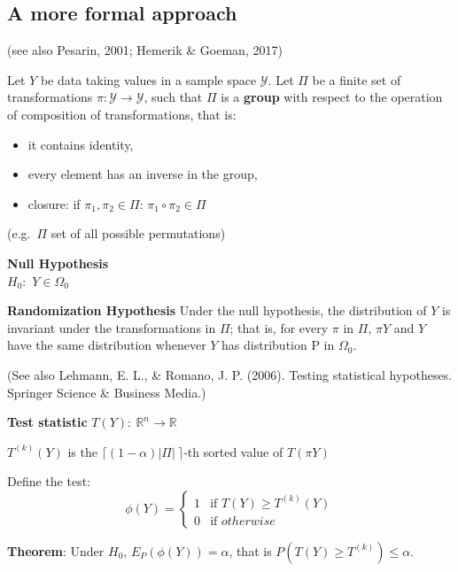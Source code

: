 \documentclass[
]{article}
\providecommand{\tightlist}{%
  \setlength{\itemsep}{0pt}\setlength{\parskip}{0pt}}
\begin{document}
\hypertarget{a-more-formal-approach}{%
\subsection{A more formal approach}\label{a-more-formal-approach}}

(see also Pesarin, 2001; Hemerik \& Goeman, 2017)

Let \(Y\) be data taking values in a sample space \(\mathcal{Y}\). Let
\(\Pi\) be a finite set of transformations
\(\pi : \mathcal{Y} \rightarrow \mathcal{Y}\), such that \(\Pi\) is a
\textbf{group} with respect to the operation of composition of
transformations, that is:

\begin{itemize}
\tightlist
\item
  it contains identity,
\item
  every element has an inverse in the group,
\item
  closure: if \(\pi_1,\pi_2\in\Pi\): \(\pi_1\circ\pi_2\in\Pi\)
\end{itemize}

(e.g.~\(\Pi\) set of all possible permutations)

\textbf{Null Hypothesis}\\
\(H_0:\) \(Y\in \Omega_0\)

\textbf{Randomization Hypothesis} Under the null hypothesis, the
distribution of \(Y\) is invariant under the transformations in \(\Pi\);
that is, for every \(\pi\) in \(\Pi\), \(\pi Y\) and \(Y\) have the same
distribution whenever \(Y\) has distribution P in \(\Omega_0\).

(See also Lehmann, E. L., \& Romano, J. P. (2006). Testing statistical
hypotheses. Springer Science \& Business Media.)

\textbf{Test statistic} \(T(Y):\ \mathbb{R}^n\to\mathbb{R}\)

\(T^{(k)}(Y)\) is the \(\lceil(1-\alpha)|\Pi|\ \rceil\)-th sorted value
of \(T(\pi Y)\)

Define the test: \begin{equation}
\phi(Y) = 
\begin{cases} 
1 & \text{if } T(Y)\geq T^{(k)}(Y) \\
0 & \text{if } otherwise
\end{cases}
\end{equation}

\textbf{Theorem}: Under \(H_0\), \(E_P(\phi(Y))=\alpha\), that is
\(P(T(Y) \geq T^{(k)}) \leq \alpha\).
\end{document}
